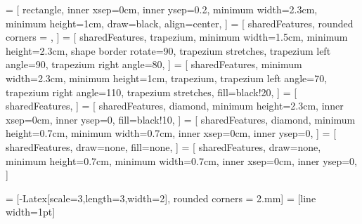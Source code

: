 
 = [
        rectangle, 
        inner xsep=0cm,
        inner ysep=0.2\baselineskip,
        minimum width=2.3cm, 
        minimum height=1cm, 
        draw=black, 
        align=center,
    ]
 = [
        sharedFeatures, 
        rounded corners = \corners, 
    ]
 = [
        sharedFeatures, 
        trapezium, 
        minimum width=1.5cm, 
        minimum height=2.3cm,     
        shape border rotate=90,
        trapezium stretches,
        trapezium left angle=90,
        trapezium right angle=80,
    ]
 = [
        sharedFeatures,
        minimum width=2.3cm,
        minimum height=1cm,
        trapezium, 
        trapezium left angle=70, 
        trapezium right angle=110,
        trapezium stretches,
        fill=black!20,
    ]
 = [
        sharedFeatures,
    ]
 = [
        sharedFeatures,
        diamond,
        minimum height=2.3cm,
        inner xsep=0cm,
        inner ysep=0\baselineskip,        
        fill=black!10,
    ]
 = [
        sharedFeatures,
        diamond,
        minimum height=0.7cm,
        minimum width=0.7cm,
        inner xsep=0cm,
        inner ysep=0\baselineskip,        
    ]    
 = [
        sharedFeatures,
        draw=none,
        fill=none,
    ] 
 = [
        sharedFeatures,
        draw=none,
        minimum height=0.7cm,
        minimum width=0.7cm,
        inner xsep=0cm,
        inner ysep=0\baselineskip,        
    ]    

\def\corners{2.mm}
 = [-{Latex[scale=3,length=3,width=2]}, rounded corners = \corners]
 = [line width=1pt]


